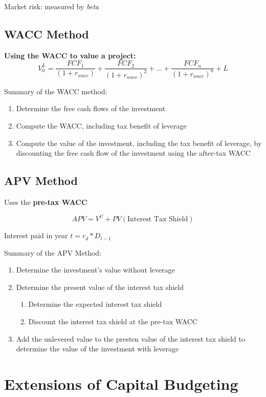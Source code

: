 \documentclass{report}
\begin{document}
Market risk: measured by \textit{beta}

\vspace*{1\baselineskip}

\subsection{WACC Method}
\label{sec:wacc-method}

\textbf{Using the WACC to value a project:} \[ V_0^L= \frac{FCF_1}{(1+r_{wacc})} + \frac{FCF_2}{(1+r_{wacc})^2} + ... + \frac{FCF_n}{(1+r_{wacc})^n} + L \]

Summary of the WACC method:
\begin{enumerate}
\item Determine the free cash flows of the investment
\item Compute the WACC, including tax benefit of leverage
\item Compute the value of the investment, including the tax benefit of leverage, by discounting the free cash flow of the investment using the after-tax WACC
\end{enumerate}

\subsection{APV Method}
\label{sec:apv-method}

Uses the \textbf{pre-tax WACC}

\[ APV = V^U + PV{(\mbox{Interest Tax Shield})}\]

Interest paid in year $t = r_d * D_{t-1}$

\vspace*{1\baselineskip}
Summary of the APV Method:
\begin{enumerate}
\item Determine the investment's value without leverage
\item Determine the present value of the interest tax shield
  \begin{enumerate}
  \item Determine the expected interest tax shield
  \item Discount the interest tax shield at the pre-tax WACC
  \end{enumerate}
\item Add the unlevered value to the presten value of the interest tax shield to determine the value of the investment with leverage \end{enumerate}

\section{Extensions of Capital Budgeting}
\label{sec:extens-capit-budg}
\end{document}
